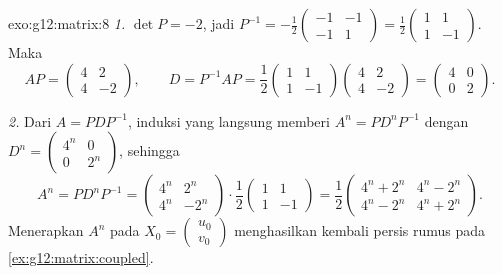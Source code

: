 \begin{solution}{exo:g12:matrix:8}
\emph{1.} $\det P = -2$, jadi
$P^{-1} = -\frac12\begin{pmatrix} -1 & -1\\ -1 & 1\end{pmatrix}
= \frac12\begin{pmatrix} 1 & 1\\ 1 & -1\end{pmatrix}$. Maka
\[
AP = \begin{pmatrix} 4 & 2\\ 4 & -2 \end{pmatrix}, \qquad
D = P^{-1}AP = \frac12\begin{pmatrix} 1&1\\1&-1\end{pmatrix}
\begin{pmatrix} 4&2\\4&-2\end{pmatrix}
= \begin{pmatrix} 4 & 0\\ 0 & 2\end{pmatrix}.
\]

\emph{2.} Dari $A = PDP^{-1}$, induksi yang langsung memberi
$A^n = PD^nP^{-1}$ dengan
$D^n = \begin{pmatrix} 4^n & 0\\ 0 & 2^n\end{pmatrix}$, sehingga
\[
A^n = P D^n P^{-1}
= \begin{pmatrix} 4^n & 2^n\\ 4^n & -2^n\end{pmatrix}\cdot
\frac12\begin{pmatrix} 1&1\\1&-1\end{pmatrix}
= \frac12\begin{pmatrix} 4^n + 2^n & 4^n - 2^n\\
4^n - 2^n & 4^n + 2^n\end{pmatrix}.
\]
Menerapkan $A^n$ pada $X_0 = \begin{pmatrix} u_0\\v_0\end{pmatrix}$ menghasilkan
kembali persis rumus pada \cref{ex:g12:matrix:coupled}.
\end{solution}

